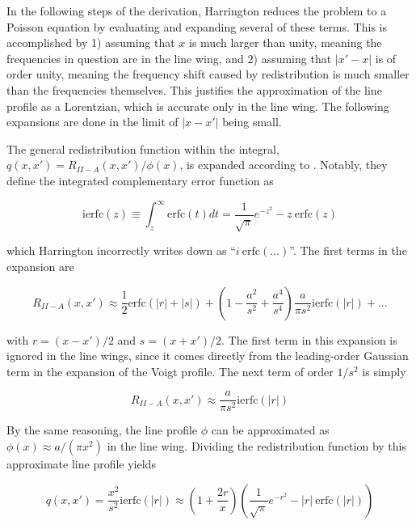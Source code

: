 \documentclass[onecolumn]{aastex63}
\begin{document}
In the following steps of the derivation, Harrington reduces the problem to a Poisson equation by evaluating and expanding several of these terms. This is accomplished by 1) assuming that $x$ is much larger than unity, meaning the frequencies in question are in the line wing, and 2) assuming that $|x'-x|$ is of order unity, meaning the frequency shift caused by redistribution is much smaller than the frequencies themselves. This justifies the approximation of the line profile as a Lorentzian, which is accurate only in the line wing. The following expansions are done in the limit of $|x-x'|$ being small. 

The general redistribution function within the integral, $q(x, x') = R_{II-A}(x, x')/\phi (x)$, is expanded according to \cite{1971JQSRT..11.1365A}. Notably, they define the integrated complementary error function as 

\begin{equation}
    \mathrm{ierfc}(z) \equiv \int_z^{\infty} \mathrm{erfc}(t) dt = \frac{1}{\sqrt{\pi}} e^{-z^2} - z\  \mathrm{erfc}(z)
\end{equation}

\noindent which Harrington incorrectly writes down as ``$i\ \mathrm{erfc(...)}$''. The first terms in the expansion are 

\begin{equation}
    R_{II-A}(x, x') \approx \frac{1}{2}\mathrm{erfc}(|r|+|s|) + \left(1 - \frac{a^2}{s^2} + \frac{a^4}{s^4}\right) \frac{a}{\pi s^2} \mathrm{ierfc}(|r|) + ...
\end{equation}

\noindent with $r=(x-x')/2$ and $s=(x+x')/2$. The first term in this expansion is ignored in the line wings, since it comes directly from the leading-order Gaussian term in the expansion of the Voigt profile. The next term of order $1/s^2$ is simply

\begin{equation}
    R_{II-A}(x, x') \approx \frac{a}{\pi s^2}\mathrm{ierfc}(|r|)
\end{equation}

\noindent By the same reasoning, the line profile $\phi$ can be approximated as $\phi(x) \approx a/(\pi x^2)$ in the line wing. Dividing the redistribution function by this approximate line profile yields 

\begin{equation}
    q(x, x') = \frac{x^2}{s^2} \mathrm{ierfc}(|r|) \approx \left(1+\frac{2r}{x}\right)\left(\frac{1}{\sqrt{\pi}}e^{-r^2} - |r|\ \mathrm{erfc}(|r|)\right)
\end{equation}
\end{document}

